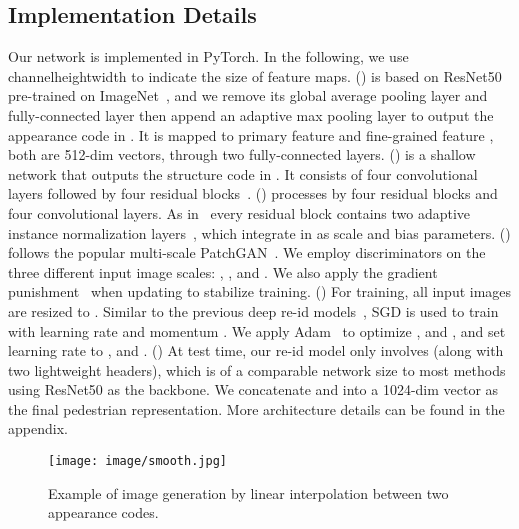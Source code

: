 \documentclass[10pt,twocolumn,letterpaper]{article}
\begin{document}
\subsection{Implementation Details}
\label{sec:Implementation Detail}
Our network is implemented in PyTorch. In the following, we use channelheightwidth to indicate the size of feature maps. (\textbf{})  is based on ResNet50~\cite{he2016deep} pre-trained on ImageNet~\cite{imagenet}, and we remove its global average pooling layer and fully-connected layer then append an adaptive max pooling layer to output the appearance code  in . It is mapped to primary feature  and fine-grained feature , both are 512-dim vectors, through two fully-connected layers. 
(\textbf{})  is a shallow network that outputs the structure code  in . It consists of four convolutional layers followed by four residual blocks~\cite{he2016deep}. 
(\textbf{})  processes  by four residual blocks and four convolutional layers. As in~\cite{huang2018multimodal} every residual block contains two adaptive instance normalization layers~\cite{huang2017arbitrary}, which integrate in  as scale and bias parameters.
(\textbf{})  follows the popular multi-scale PatchGAN~\cite{isola2017image}. We employ discriminators on the three different input image scales: , , and . We also apply the gradient punishment~\cite{Mescheder2018ICML} when updating  to stabilize training. 
(\textbf{}) For training, all input images are resized to . Similar to the previous deep re-id models~\cite{zheng2016survey}, SGD is used to train  with learning rate  and momentum . We apply Adam~\cite{kingma2014adam} to optimize ,  and , and set learning rate to , and . (\textbf{}) At test time, our re-id model only involves  (along with two lightweight headers), which is of a comparable network size to most methods using ResNet50 as the backbone. We concatenate  and  into a 1024-dim vector as the final pedestrian representation. More architecture details can be found in the appendix.



\begin{figure}[t]
\vspace{-2mm}
\begin{center}
   \texttt{[image: image/smooth.jpg]}
\end{center}
\vspace{-.2in}
   \caption{Example of image generation by linear interpolation between two appearance codes. 
   }
\label{fig:smooth}
\end{figure}
\end{document}
